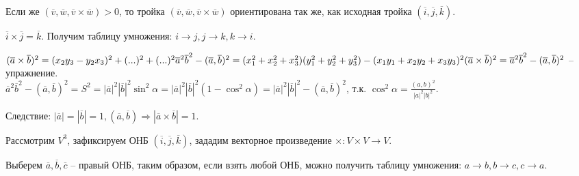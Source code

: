 \begin{MyList}
		  \item Если же $(\overline{v}, \overline{w}, \overline{v} \times \overline{w}) > 0$, то тройка $(\overline{v}, \overline{w}, \overline{v} \times \overline{w})$ ориентирована так же, как исходная тройка $(\overline{i}, \overline{j}, \overline{k})$.   
		  \item $\overline{i} \times \overline{j} = \overline{k}$. Получим таблицу умножения: $i \to j, j \to k, k \to i$.
		  \item $(\overline{a} \times \overline{b})^2 = (x_2 y_3 - y_2 x_3)^2 + (...)^2 + (...)^2 \\
		  \overline{a}^2 \overline{b}^2 - (\overline{a}, \overline{b})^2 = (x_1^2 + x_2^2 + x_3^2)(y_1^2 + y_2^2 + y_3^2) - (x_1y_1 +x_2y_2 +x_3y_3)^2 \\
		  (\overline{a} \times \overline{b})^2 = \overline{a}^2 \overline{b}^2 - (\overline{a}, \overline{b})^2$ -- упражнение.\\
		  $\overline{a}^2 \overline{b}^2 - (\overline{a}, \overline{b})^2 = S^2 = |\overline{a}|^2 |\overline{b}|^2 \sin^2\alpha = |\overline{a}|^2 |\overline{b}|^2 (1 - \cos^2 \alpha) = |\overline{a}|^2 |\overline{b}|^2 - (\overline{a}, \overline{b})^2$, т.к. $\cos^2 \alpha = \frac{(a, b)^2}{|a|^2|b|^2}$.\\
	  \begin{figure}[h]
		  \centering
		  \def\svgwidth{0.3\columnwidth}
		  
	  \end{figure}
	  Следствие: $|\overline{a}| = |\overline{b}| = 1,  (\overline{a}, \overline{b}) \Rightarrow |\overline{a} \times \overline{b}| = 1$.
  \end{MyList}
  
	Рассмотрим $V^3$, зафиксируем ОНБ $(\overline{i}, \overline{j}, \overline{k})$, зададим векторное произведение $\times: V \times V \to V$.

	Выберем $\overline{a}, \overline{b}, \overline{c}$ -- правый ОНБ, таким образом, если взять любой ОНБ, можно получить таблицу умножения: $a \to b, b \to c, c \to a$.

